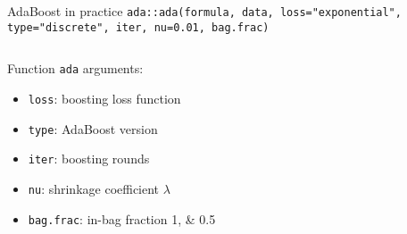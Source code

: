 \begin{frame}{AdaBoost in practice}
\vspace*{-2.5em}\lstinline|ada::ada(formula, data, loss="exponential", type="discrete", iter, nu=0.01, bag.frac)|\bigskip\smallskip

\begin{columns}[T]
\begin{column}{0.5\textwidth}
Function \texttt{ada} arguments:\vspace{-1ex}
{\small\begin{itemize}
	\setlength{\itemsep}{-0.8ex}
	\item \texttt{loss}: boosting loss function
	\item \texttt{type}: AdaBoost version
	\item \texttt{iter}: boosting rounds
	\item \texttt{nu}: shrinkage coefficient $\lambda$
	\item \texttt{bag.frac}: in-bag fraction \numlist{1;0.5}
\end{itemize}}
\end{column}
\begin{column}{0.5\textwidth}
\begin{figure}
\end{figure}
\end{column}
\end{columns}

\end{frame}




